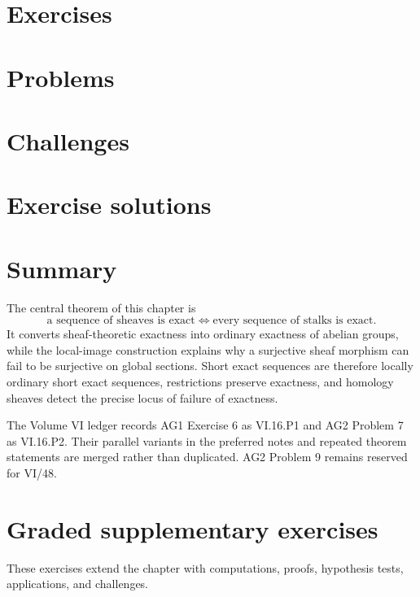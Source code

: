 \section{Exercises}

\ifdefined\IncludeExerciseHints

\fi

\section{Problems}


\section{Challenges}


\ifdefined\IncludeExerciseSolutions
\section{Exercise solutions}

\fi

\section*{Summary}

The central theorem of this chapter is
\[
\boxed{
\text{a sequence of sheaves is exact}
\iff
\text{every sequence of stalks is exact}.}
\]
It converts sheaf-theoretic exactness into ordinary exactness of abelian groups, while the
local-image construction explains why a surjective sheaf morphism can fail to be surjective
on global sections.  Short exact sequences are therefore locally ordinary short exact
sequences, restrictions preserve exactness, and homology sheaves detect the precise locus of
failure of exactness.

The Volume VI ledger records AG1 Exercise 6 as VI.16.P1 and AG2 Problem 7 as VI.16.P2.  Their
parallel variants in the preferred notes and repeated theorem statements are merged rather
than duplicated.  AG2 Problem 9 remains reserved for VI/48.
\section{Graded supplementary exercises}
These exercises extend the chapter with computations, proofs, hypothesis tests, applications, and challenges.

